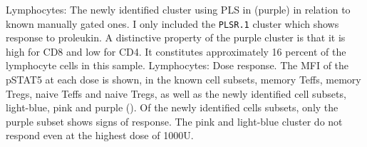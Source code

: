 { Lymphocytes: The newly identified cluster using \gls{PLS} in  (purple) in relation to known manually gated ones. }
{
    I only included the \texttt{PLSR.1} cluster which shows response to proleukin.
    A distinctive property of the purple cluster is that it is high for CD8 and low for CD4.
    It constitutes approximately 16 percent of the lymphocyte cells in this sample.
}
{ Lymphocytes: Dose response. }
{
    The MFI of the pSTAT5 at each dose is shown, in the known cell subsets, memory Teffs, memory Tregs, naive Teffs
    and naive Tregs, as well as the newly identified cell subsets, light-blue, pink and purple ().
    Of the newly identified cells subsets, only the purple subset shows signs of response.
    The pink and light-blue cluster do not respond even at the highest dose of 1000U.
}
\clearpage


